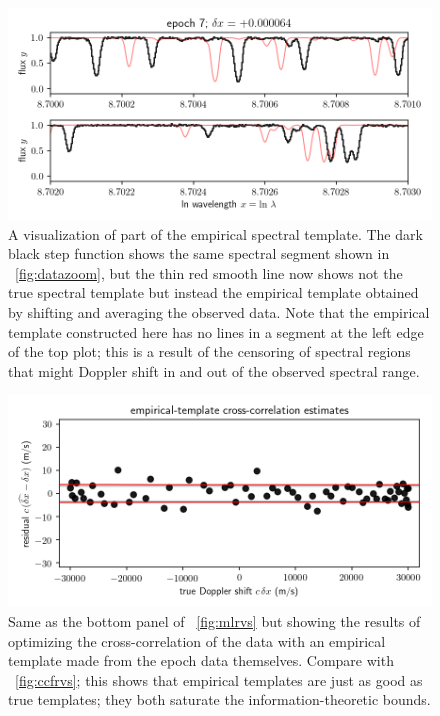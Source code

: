 \documentclass[modern]{aastex631}
\newcommand{\figref}[1]{\figurename~\ref{#1}}
\begin{document}
\begin{figure}[tp]
  \begin{mdframed}
    \begin{center}
    \includegraphics[width=\textwidth]{../notebook/empirical.png}
    \end{center}
    \caption{A visualization of part of the empirical spectral template. The dark black step function shows the same spectral segment shown in \figref{fig:datazoom}, but the thin red smooth line now shows not the true spectral template but instead the empirical template obtained by shifting and averaging the observed data. Note that the empirical template constructed here has no lines in a segment at the left edge of the top plot; this is a result of the censoring of spectral regions that might Doppler shift in and out of the observed spectral range.\label{fig:empirical}}
  \end{mdframed}
\end{figure}
\begin{figure}[tp]
  \begin{mdframed}
    \begin{center}
    \includegraphics[width=\textwidth]{../notebook/empiricalrvs.png}
    \end{center}
    \caption{Same as the bottom panel of \figref{fig:mlrvs} but showing the results of optimizing the cross-correlation of the data with an empirical template made from the epoch data themselves. Compare with \figref{fig:ccfrvs}; this shows that empirical templates are just as good as true templates; they both saturate the information-theoretic bounds.\label{fig:empiricalrvs}}
  \end{mdframed}
\end{figure}
\end{document}
